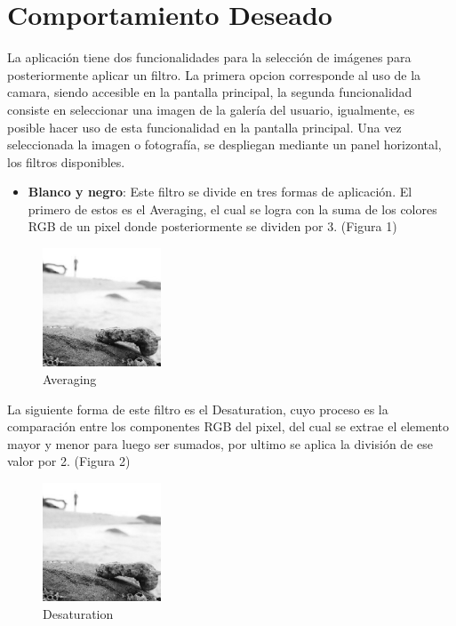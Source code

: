 \documentclass[journal]{IEEEtran}
\begin{document}
\section{Comportamiento Deseado}
La aplicación tiene dos funcionalidades para la selección de imágenes para posteriormente aplicar un filtro. La primera opcion corresponde al uso de la camara, siendo accesible en la pantalla principal, la segunda funcionalidad consiste en seleccionar una imagen de la galería del usuario, igualmente, es posible hacer uso de esta funcionalidad en la pantalla principal. Una vez seleccionada la imagen o fotografía, se despliegan mediante un panel horizontal, los filtros disponibles. \\

\begin{itemize}
	
	\item{\bf Blanco y negro}: Este filtro se divide en tres formas de aplicación. El primero de estos es el Averaging, el cual se logra con la suma de los colores RGB de un pixel donde posteriormente se dividen por 3. (Figura 1)
	
\end{itemize}	

	\begin{figure}[h]
		\centering
		\includegraphics[width = 100pt]{averaging.jpeg}
		\caption{Averaging}
	\end{figure}

	La siguiente forma de este filtro es el Desaturation, cuyo proceso es la comparación entre los componentes RGB del pixel, del cual se extrae el elemento mayor y menor para luego ser sumados, por ultimo se aplica la división de ese valor por 2. (Figura 2) 
	
	\begin{figure}[h]
		\centering
		\includegraphics[width = 100pt]{desaturation.jpeg}
		\caption{Desaturation}
	\end{figure}
	
\end{document}
